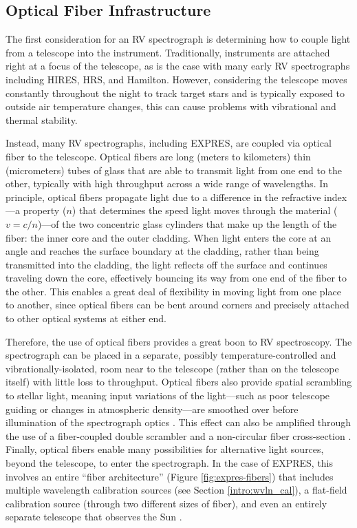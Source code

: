 \subsection{Optical Fiber Infrastructure} \label{intro:optics:fiber}

The first consideration for an RV spectrograph is determining how to couple light from a telescope into the instrument. Traditionally, instruments are attached right at a focus of the telescope, as is the case with many early RV spectrographs including HIRES, HRS, and Hamilton. However, considering the telescope moves constantly throughout the night to track target stars and is typically exposed to outside air temperature changes, this can cause problems with vibrational and thermal stability.

Instead, many RV spectrographs, including EXPRES, are coupled via optical fiber to the telescope. Optical fibers are long (meters to kilometers) thin (micrometers) tubes of glass that are able to transmit light from one end to the other, typically with high throughput across a wide range of wavelengths. In principle, optical fibers propagate light due to a difference in the refractive index---a property ($n$) that determines the speed light moves through the material ($v=c/n$)---of the two concentric glass cylinders that make up the length of the fiber: the inner core and the outer cladding. When light enters the core at an angle and reaches the surface boundary at the cladding, rather than being transmitted into the cladding, the light reflects off the surface and continues traveling down the core, effectively bouncing its way from one end of the fiber to the other. This enables a great deal of flexibility in moving light from one place to another, since optical fibers can be bent around corners and precisely attached to other optical systems at either end.

Therefore, the use of optical fibers provides a great boon to RV spectroscopy. The spectrograph can be placed in a separate, possibly temperature-controlled and vibrationally-isolated, room near to the telescope (rather than on the telescope itself) with little loss to throughput. Optical fibers also provide spatial scrambling to stellar light, meaning input variations of the light---such as poor telescope guiding or changes in atmospheric density---are smoothed over before illumination of the spectrograph optics \citep{hunter_scrambling_1992}. This effect can also be amplified through the use of a fiber-coupled double scrambler \citep{halverson_efficient_2015, spronck_fiber_2015} and a non-circular fiber cross-section \citep{chazelas_new_2010, spronck_use_2012, plavchan_precision_2013}. Finally, optical fibers enable many possibilities for alternative light sources, beyond the telescope, to enter the spectrograph. In the case of EXPRES, this involves an entire ``fiber architecture'' (Figure \ref{fig:expres-fibers}) that includes multiple wavelength calibration sources (see Section \ref{intro:wvln_cal}), a flat-field calibration source (through two different sizes of fiber), and even an entirely separate telescope that observes the Sun \citep{blackman_performance_2020}.


